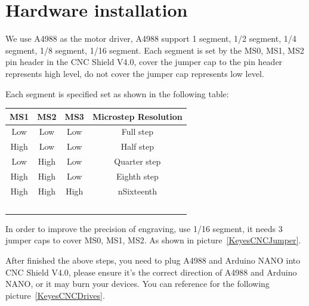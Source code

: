 \section{Hardware installation}

We use A4988 as the motor driver, A4988 support 1 segment, 1/2 segment, 1/4 segment, 1/8 segment, 1/16 segment. Each segment is set by the MS0, MS1, MS2 pin header in the CNC Shield V4.0, cover the jumper cap to the pin header represents high level, do not cover the jumper cap represents low level.

Each segment is specified set as shown in the following table:

\begin{center}
  \begin{tabular}{cccc}
    MS1   & MS2	 & MS3  & Microstep Resolution \\ \hline
    Low   & Low  & Low  & Full step \\
    High  & Low  & Low  & Half step \\
    Low   & High & Low  & Quarter step \\
    High  & High & Low  & Eighth step  \\
    High  & High & High & nSixteenth \\\
  \end{tabular}
\end{center}


In order to improve the precision of engraving, use 1/16 segment, it needs 3 jumper caps to cover MS0, MS1, MS2. As shown in picture~\ref{KeyesCNCJumper}.

\begin{center}
	
	\label{KeyesCNCJumper}
\end{center}

After finished the above steps, you need to plug A4988 and Arduino NANO into CNC Shield V4.0, please ensure it’s the correct direction of A4988 and Arduino NANO, or it may burn your devices. You can reference for the following picture~\ref{KeyesCNCDrives}.

\begin{center}
	
	\label{KeyesCNCDrives}
\end{center}

